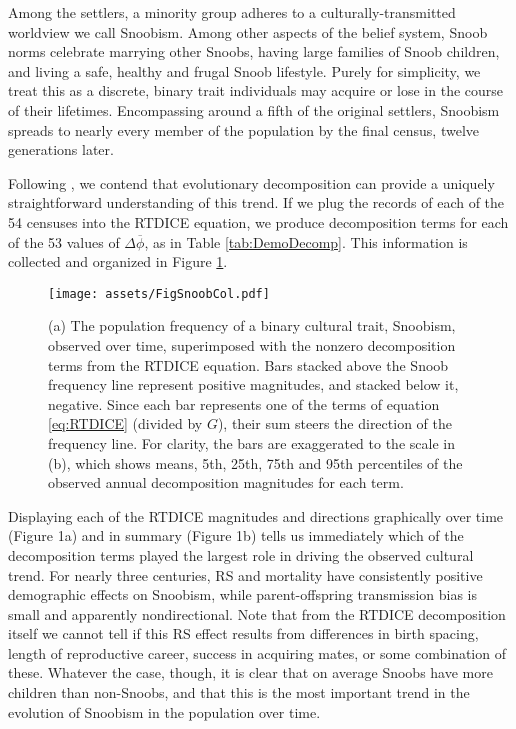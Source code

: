 \documentclass[11pt]{article}
\begin{document}
Among the settlers, a minority group adheres to a culturally-transmitted worldview we call Snoobism.  Among other aspects of the belief system, Snoob norms celebrate marrying other Snoobs, having large families of Snoob children, and living a safe, healthy and frugal Snoob lifestyle.  Purely for simplicity, we treat this as a discrete, binary trait individuals may acquire or lose in the course of their lifetimes.  Encompassing around a fifth of the original settlers, Snoobism spreads to nearly every member of the population by the final census, twelve generations later.  

Following \cite{ozgul2009dynamics}, we contend that evolutionary decomposition can provide a uniquely straightforward understanding of this trend.  If we plug the records of each of the 54 censuses into the RTDICE equation, we produce decomposition terms for each of the 53 values of $\Delta \overline{\phi}$, as in Table \ref{tab:DemoDecomp}.  This information is collected and organized in Figure \ref{fig:Snoob}.

\begin{figure}[t]
\begin{center} 
\texttt{[image: assets/FigSnoobCol.pdf]}
\caption{(a) The population frequency of a binary cultural trait, Snoobism, observed over time, superimposed with the nonzero decomposition terms from the RTDICE equation.  Bars stacked above the Snoob frequency line represent positive magnitudes, and stacked below it, negative.  Since each bar represents one of the terms of equation \ref{eq:RTDICE} (divided by $G$), their sum steers the direction of the frequency line.  For clarity, the bars are exaggerated to the scale in (b), which shows means, 5th, 25th, 75th and 95th percentiles of the observed annual decomposition magnitudes for each term.}
\label{fig:Snoob}
\end{center}
\end{figure}

Displaying each of the RTDICE magnitudes and directions graphically over time (Figure 1a) and in summary (Figure 1b) tells us immediately which of the decomposition terms played the largest role in driving the observed cultural trend.  For nearly three centuries, RS and mortality have consistently positive demographic effects on Snoobism, while parent-offspring transmission bias is small and apparently nondirectional.  Note that from the RTDICE decomposition itself we cannot tell if this RS effect results from differences in birth spacing, length of reproductive career, success in acquiring mates, or some combination of these.  Whatever the case, though, it is clear that on average Snoobs have more children than non-Snoobs, and that this is the most important trend in the evolution of Snoobism in the population over time.  
\end{document}
